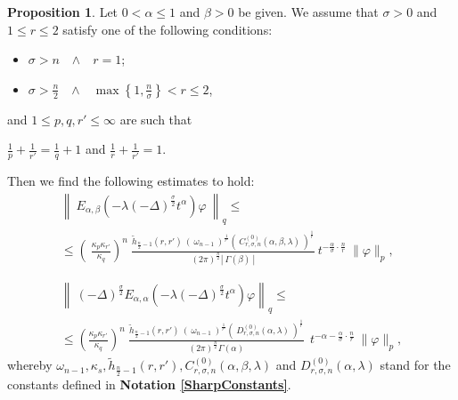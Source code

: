 \documentclass{amsart}
\theoremstyle{definition}
\newtheorem{proposition}[theorem]{Proposition}
\theoremstyle{remark}
\numberwithin{equation}{section}
\begin{document}
\begin{proposition}\label{YoungIneqProposition}
	Let $0<\alpha\leq 1$ and $\beta>0$ be given.  
	We assume that $\sigma>0$ and $1\leq r\leq 2$ satisfy one of the following conditions:
	\begin{itemize}
		\item[{\bf (a)}] $\displaystyle \sigma>n$~~$\wedge$~~$r=1$;
		\item[{\bf (b)}] $\displaystyle \sigma>\frac{n}{2}$~~$\wedge$~~$\displaystyle \max\left\{1,\frac{n}{\sigma}\right\} <r\leq 2$,
	\end{itemize}
	and $1\leq p,q,r'\leq \infty$ are such that
	\begin{center}
		$\displaystyle \frac{1}{p}+\frac{1}{r'}=\frac{1}{q}+1$ and $\displaystyle \frac{1}{r}+\frac{1}{r'}=1$.
	\end{center}
	
	Then we find the following estimates to hold: 
	\begin{eqnarray}
		\label{YoungIneqHankel}
		\displaystyle \left\|~E_{\alpha,\beta}\left(-\lambda (-\Delta)^{\frac{\sigma}{2}} t^{\alpha}\right)\varphi~\right\|_q \leq \nonumber \\
		\leq \left(~\frac{\kappa_p\kappa_{r'}}{\kappa_q}\right)^n~  \frac{\widetilde{h}_{\frac{n}{2}-1}(r,r')~ \left(~\omega_{n-1}~\right)^{\frac{1}{r'}}\left(~C_{r,\sigma,n}^{(0)}(\alpha,\beta,\lambda)~\right)^{\frac{1}{r}}}{(2\pi)^{\frac{n}{2}}\left|~\Gamma(\beta)~\right|}~t^{-\frac{\alpha}{\sigma }\cdot \frac{n}{r}}~
		\|\varphi\|_p,
		\\ \nonumber \\ \nonumber \\
		\label{YoungIneqHankel2}\displaystyle \left\|~ (-\Delta)^{\frac{\sigma}{2}}E_{\alpha,\alpha}\left(-\lambda (-\Delta)^{\frac{\sigma}{2}} t^{\alpha}\right)\varphi\right\|_q\leq \nonumber \\
		\leq \left(\frac{\kappa_p\kappa_{r'}}{\kappa_q}\right)^n~ \frac{\widetilde{h}_{\frac{n}{2}-1}(r,r')~\left(~\omega_{n-1}~\right)^{\frac{1}{r'}}\left(~D_{r,\sigma,n}^{(0)}(\alpha,\lambda)~\right)^{\frac{1}{r}}}{(2\pi)^{\frac{n}{2}}\Gamma(\alpha)}~~t^{-\alpha-\frac{\alpha}{\sigma }\cdot \frac{n}{r}}~
		\|\varphi\|_p,
	\end{eqnarray}
	whereby $\omega_{n-1},\kappa_s,\widetilde{h}_{\frac{n}{2}-1}(r,r'),C_{r,\sigma,n}^{(0)}(\alpha,\beta,\lambda)$ and $D_{r,\sigma,n}^{(0)}(\alpha,\lambda)$ stand for the constants defined in {\bf Notation \ref{SharpConstants}}.
\end{proposition}
\end{document}
